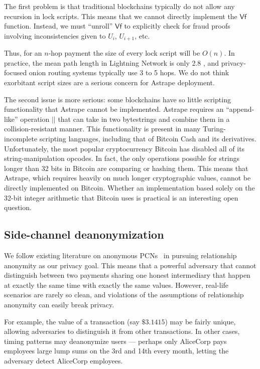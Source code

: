 \documentclass[USenglish,oneside,twocolumn]{article}
\begin{document}
The first problem is that traditional blockchains typically do not allow any recursion in lock scripts. This means that we cannot directly implement the $\mathsf{Vf}$ function. Instead, we must ``unroll'' $\mathsf{Vf}$ to explicitly check for fraud proofs involving inconsistencies given to $U_i$, $U_{i+1}$, etc.

Thus, for an $n$-hop payment the size of every lock script will be $O(n)$. In practice, the mean path length in Lightning Network is only 2.8 \cite{seres2019topological}, and privacy-focused onion routing systems typically use 3 to 5 hops. We do not think exorbitant script sizes are a serious concern for Astrape deployment.

The second issue is more serious: some blockchains have so little scripting functionality that Astrape cannot be implemented. Astrape requires an ``append-like'' operation $||$ that can take in two bytestrings and combine them in a collision-resistant manner. This functionality is present in many Turing-incomplete scripting languages, including that of Bitcoin Cash and its derivatives. Unfortunately, the most popular cryptocurrency Bitcoin has disabled all of its string-manipulation opcodes. In fact, the only operations possible for strings longer than 32 bits in Bitcoin are comparing or hashing them. This means that Astrape, which requires heavily on much longer cryptographic values, cannot be directly implemented on Bitcoin. Whether an implementation based solely on the 32-bit integer arithmetic that Bitcoin uses is practical is an interesting open question.

\subsection{Side-channel deanonymization}

We follow existing literature on anonymous PCNs~\cite{malavolta2017concurrency,malavolta2019anonymous} in pursuing relationship anonymity as our privacy goal. This means that a powerful adversary that cannot distinguish between two payments sharing one honest intermediary that happen at exactly the same time with exactly the same values. However, real-life scenarios are rarely so clean, and violations of the assumptions of relationship anonymity can easily break privacy.

For example, the value of a transaction (say $\$3.1415$) may be fairly unique, allowing adversaries to distinguish it from other transactions. In other cases, timing patterns may deanonymize users --- perhaps only AliceCorp pays employees large lump sums on the 3rd and 14th every month, letting the adversary detect AliceCorp employees.
\end{document}
